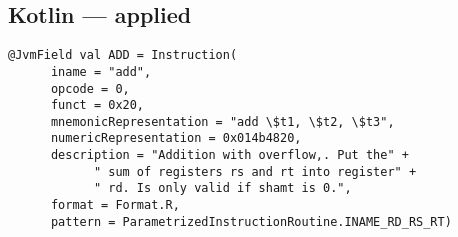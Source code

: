 \subsection{Kotlin --- applied}

\begin{lstlisting}[style=java]
@JvmField val ADD = Instruction(
      iname = "add",
      opcode = 0,
      funct = 0x20,
      mnemonicRepresentation = "add \$t1, \$t2, \$t3",
      numericRepresentation = 0x014b4820,
      description = "Addition with overflow,. Put the" +
            " sum of registers rs and rt into register" +
            " rd. Is only valid if shamt is 0.",
      format = Format.R,
      pattern = ParametrizedInstructionRoutine.INAME_RD_RS_RT)
\end{lstlisting}

